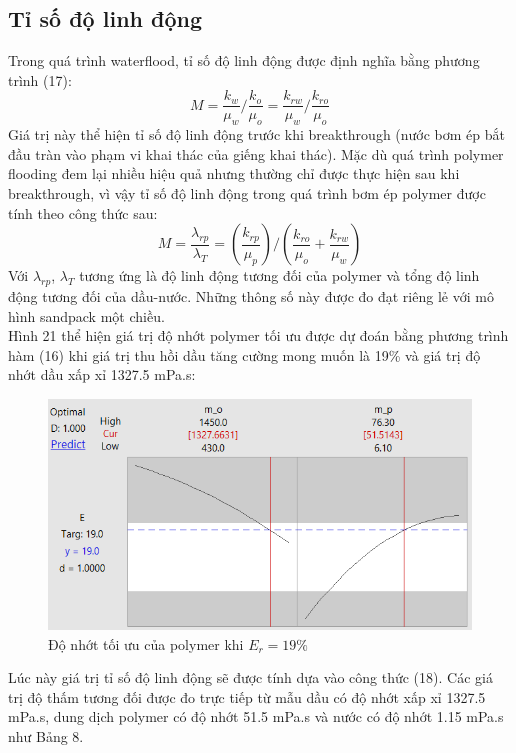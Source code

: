 \documentclass[12pt,a4paper]{article}
\begin{document}
	\subsection{Tỉ số độ linh động}
	Trong quá trình waterflood, tỉ số độ linh động \cite{chang1978polymer} được định nghĩa bằng phương trình (17):
		\begin{equation}
		M=\frac{k_w}{\mu_w}/\frac{k_{o}}{\mu_o}=\frac{k_{rw}}{\mu_{w}}/\frac{k_{ro}}{\mu_o}
		\end{equation}
	Giá trị này thể hiện tỉ số độ linh động trước khi breakthrough (nước bơm ép bắt đầu tràn vào phạm vi khai thác của giếng khai thác). Mặc dù quá trình polymer flooding đem lại nhiều hiệu quả nhưng thường chỉ được thực hiện sau khi breakthrough, vì vậy tỉ số độ linh động trong quá trình bơm ép polymer \cite{chang1978polymer} được tính theo công thức sau:
		\begin{equation}
			M=\frac{\lambda_{rp}}{\lambda_T}=\left(\frac{k_{rp}}{\mu_p}\right)/\left(\frac{k_{ro}}{\mu_o}+\frac{k_{rw}}{\mu_w}\right)
		\end{equation}
	Với $\lambda_{rp}$, $\lambda_T$ tương ứng là độ linh động tương đối của polymer và tổng độ linh động tương đối của dầu-nước. Những thông số này được đo đạt riêng lẻ với mô hình sandpack một chiều.\\
	Hình 21 thể hiện giá trị độ nhớt polymer tối ưu được dự đoán bằng phương trình hàm (16) khi giá trị thu hồi dầu tăng cường mong muốn là 19\% và giá trị độ nhớt dầu xấp xỉ 1327.5 mPa.s:
	\begin{figure}[h]
		\centering
		\includegraphics[scale=.9]{Fig/OptimizationPlot19.png}
		\caption{Độ nhớt tối ưu của polymer khi $E_r=19\%$}
	\end{figure}
\newpage
\noindent
	Lúc này giá trị tỉ số độ linh động sẽ được tính dựa vào công thức (18). Các giá trị độ thấm tương đối được đo trực tiếp từ mẫu dầu có độ nhớt xấp xỉ 1327.5 mPa.s, dung dịch polymer có độ nhớt 51.5 mPa.s và nước có độ nhớt 1.15 mPa.s như Bảng 8.
\end{document}
